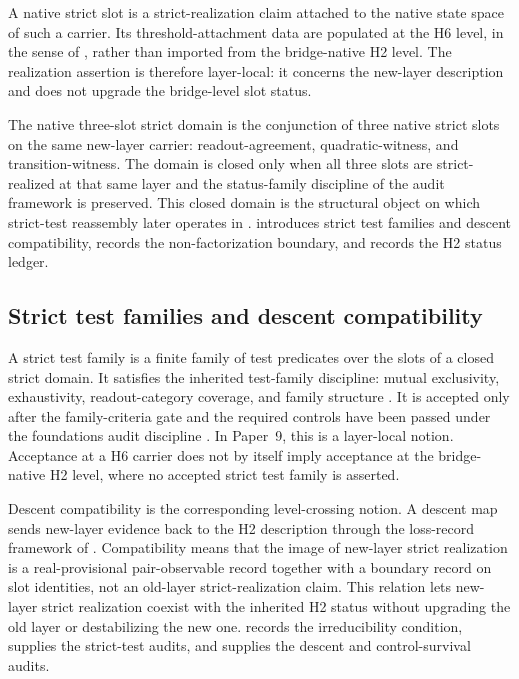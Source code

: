\documentclass[11pt]{article}
\newcommand{\OldLayer}{H2}
\newcommand{\NewLayer}{H6}
\newcommand{\PaperNine}{Paper~9}
\theoremstyle{definition}
\begin{document}
A native strict slot is a strict-realization claim attached to the native state
space of such a carrier.  Its threshold-attachment data are populated at the
\NewLayer{} level, in the sense of \cite{Tsiokos2026FoundationsII}, rather than
imported from the bridge-native \OldLayer{} level.  The realization assertion is
therefore layer-local: it concerns the new-layer description and does not
upgrade the bridge-level slot status.

The native three-slot strict domain is the conjunction of three native strict
slots on the same new-layer carrier: readout-agreement, quadratic-witness, and
transition-witness.  The domain is closed only when all three slots are
strict-realized at that same layer and the status-family discipline of the
audit framework is preserved.  This closed domain is the structural object on
which strict-test reassembly later operates in .
 introduces strict test
families and descent compatibility, 
records the non-factorization boundary, and
 records the \OldLayer{} status ledger.

\subsection{Strict test families and descent compatibility}\label{subsec:strict-test-family-descent-compatibility}

A strict test family is a finite family of test predicates over the slots of a
closed strict domain.  It satisfies the inherited test-family discipline:
mutual exclusivity, exhaustivity, readout-category coverage, and family
structure \cite{Tsiokos2026CarrierToEvent}.  It is accepted only after the
family-criteria gate and the required controls have been passed under the
foundations audit discipline \cite{Tsiokos2026FoundationsII}.  In
\PaperNine{}, this is a layer-local notion.  Acceptance at a \NewLayer{} carrier
does not by itself imply acceptance at the bridge-native \OldLayer{} level,
where no accepted strict test family is asserted.

Descent compatibility is the corresponding level-crossing notion.  A descent
map sends new-layer evidence back to the \OldLayer{} description through the
loss-record framework of \cite{Tsiokos2026FoundationsII}.  Compatibility means
that the image of new-layer strict realization is a real-provisional
pair-observable record together with a boundary record on slot identities, not
an old-layer strict-realization claim.  This relation lets new-layer strict
realization coexist with the inherited \OldLayer{} status without upgrading the
old layer or destabilizing the new one.  
records the irreducibility condition,  supplies the
strict-test audits, and  supplies the descent and
control-survival audits.
\end{document}
